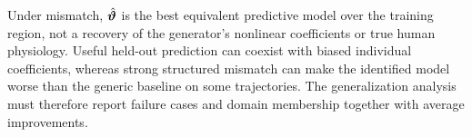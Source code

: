 Under mismatch, $\hat{\bm{\vartheta}}$ is the best equivalent predictive
model over the training region, not a recovery of the generator's nonlinear
coefficients or true human physiology.  Useful held-out prediction can coexist
with biased individual coefficients, whereas strong structured mismatch can
make the identified model worse than the generic baseline on some trajectories.
The generalization analysis must therefore report failure cases and domain
membership together with average improvements.
